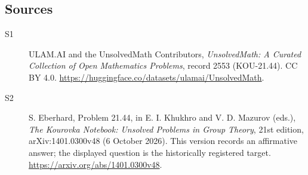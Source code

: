 \documentclass[11pt]{article}
\begin{document}
\subsection{Sources}
\begin{description}
\item[\hypertarget{source:2553:1}{S1}] ULAM.AI and the UnsolvedMath Contributors, \emph{UnsolvedMath: A Curated Collection of Open Mathematics Problems}, record 2553 (KOU-21.44). CC BY 4.0. \url{https://huggingface.co/datasets/ulamai/UnsolvedMath}.
\item[\hypertarget{source:2553:2}{S2}] S. Eberhard, Problem 21.44, in E. I. Khukhro and V. D. Mazurov (eds.), \emph{The Kourovka Notebook: Unsolved Problems in Group Theory}, 21st edition, arXiv:1401.0300v48 (6 October 2026). This version records an affirmative answer; the displayed question is the historically registered target. \url{https://arxiv.org/abs/1401.0300v48}.
\end{description}
\label{end:2553}
\end{document}
